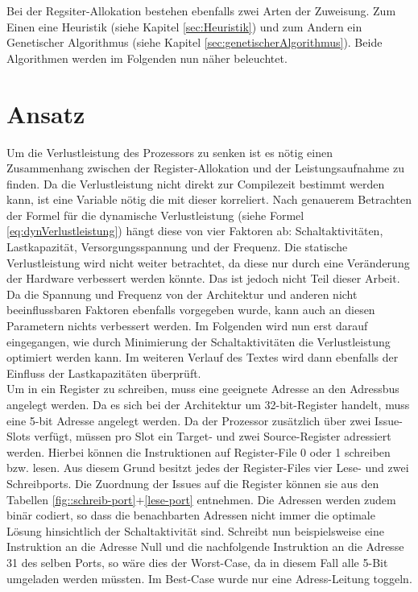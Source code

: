 \begin{itemize}
		Bei der Regsiter-Allokation bestehen ebenfalls zwei Arten der Zuweisung. Zum Einen eine Heuristik (siehe Kapitel \ref{sec:Heuristik}) und zum Andern ein Genetischer Algorithmus (siehe Kapitel \ref{sec:genetischerAlgorithmus}). Beide Algorithmen werden im Folgenden nun näher beleuchtet.
\end{itemize}


\section{Ansatz}
\label{chap:ansatz}
Um die Verlustleistung des Prozessors zu senken ist es nötig einen Zusammenhang zwischen der Register-Allokation und der Leistungsaufnahme zu finden. Da die Verlustleistung nicht direkt zur Compilezeit bestimmt werden kann, ist eine Variable nötig die mit dieser korreliert.
Nach genauerem Betrachten der Formel für die dynamische Verlustleistung (siehe Formel \ref{eq:dynVerlustleistung}) hängt diese von vier Faktoren ab: Schaltaktivitäten,  Lastkapazität, Versorgungsspannung und der Frequenz. Die statische Verlustleistung wird nicht weiter betrachtet, da diese nur durch eine Veränderung der Hardware verbessert werden könnte. Das ist jedoch nicht Teil dieser Arbeit. Da die Spannung und Frequenz von der Architektur und anderen nicht beeinflussbaren Faktoren ebenfalls vorgegeben wurde, kann auch an diesen Parametern nichts verbessert werden. Im Folgenden wird nun erst darauf eingegangen, wie durch Minimierung der Schaltaktivitäten die Verlustleistung optimiert werden kann. Im weiteren Verlauf des Textes wird dann ebenfalls der Einfluss der Lastkapazitäten überprüft.\\
Um in ein Register zu schreiben, muss eine geeignete Adresse an den Adressbus angelegt werden. Da es sich bei der Architektur um 32-bit-Register handelt, muss eine 5-bit Adresse angelegt werden.
Da der Prozessor zusätzlich über zwei Issue-Slots verfügt, müssen pro Slot ein Target- und zwei Source-Register adressiert werden. Hierbei können die Instruktionen auf Register-File 0 oder 1 schreiben bzw. lesen. Aus diesem Grund besitzt jedes der Register-Files vier Lese- und zwei Schreibports. Die Zuordnung der Issues auf die Register können sie aus den Tabellen \ref{fig::schreib-port}+\ref{lese-port} entnehmen. Die Adressen werden zudem binär codiert, so dass die benachbarten Adressen nicht immer die optimale Lösung hinsichtlich der Schaltaktivität sind. Schreibt nun beispielsweise eine Instruktion an die Adresse Null und die nachfolgende Instruktion an die Adresse 31 des selben Ports, so wäre dies der Worst-Case, da in diesem Fall alle 5-Bit umgeladen werden müssten. Im Best-Case wurde nur eine Adress-Leitung toggeln.\\
